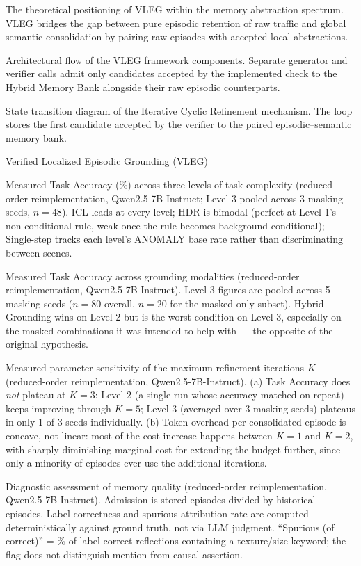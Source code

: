 \caption{The theoretical positioning of VLEG within the memory abstraction spectrum. VLEG bridges the gap between pure episodic retention of raw traffic and global semantic consolidation by pairing raw episodes with accepted local abstractions.}

\caption{Architectural flow of the VLEG framework components. Separate generator and verifier calls admit only candidates accepted by the implemented check to the Hybrid Memory Bank alongside their raw episodic counterparts.}

\caption{State transition diagram of the Iterative Cyclic Refinement mechanism. The loop stores the first candidate accepted by the verifier to the paired episodic--semantic memory bank.}

\caption{Verified Localized Episodic Grounding (VLEG)}

\caption{Measured Task Accuracy (\%) across three levels of task complexity (reduced-order reimplementation, Qwen2.5-7B-Instruct; Level 3 pooled across 3 masking seeds, $n=48$). ICL leads at every level; HDR is bimodal (perfect at Level 1's non-conditional rule, weak once the rule becomes background-conditional); Single-step tracks each level's ANOMALY base rate rather than discriminating between scenes.}

\caption{Measured Task Accuracy across grounding modalities (reduced-order reimplementation, Qwen2.5-7B-Instruct). Level 3 figures are pooled across 5 masking seeds ($n=80$ overall, $n=20$ for the masked-only subset). Hybrid Grounding wins on Level 2 but is the worst condition on Level 3, especially on the masked combinations it was intended to help with --- the opposite of the original hypothesis.}

\caption{Measured parameter sensitivity of the maximum refinement iterations $K$ (reduced-order reimplementation, Qwen2.5-7B-Instruct). (a) Task Accuracy does \emph{not} plateau at $K=3$: Level 2 (a single run whose accuracy matched on repeat) keeps improving through $K=5$; Level 3 (averaged over 3 masking seeds) plateaus in only 1 of 3 seeds individually. (b) Token overhead per consolidated episode is concave, not linear: most of the cost increase happens between $K{=}1$ and $K{=}2$, with sharply diminishing marginal cost for extending the budget further, since only a minority of episodes ever use the additional iterations.}

\caption{Diagnostic assessment of memory quality (reduced-order reimplementation, Qwen2.5-7B-Instruct). Admission is stored episodes divided by historical episodes. Label correctness and spurious-attribution rate are computed deterministically against ground truth, not via LLM judgment. ``Spurious (of correct)'' = \% of label-correct reflections containing a texture/size keyword; the flag does not distinguish mention from causal assertion.}

